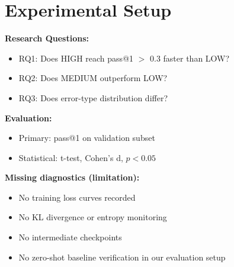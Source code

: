 \section{Experimental Setup}
\label{sec:experiments}

\textbf{Research Questions:}
\begin{itemize}
    \item RQ1: Does HIGH reach pass@1 $>$ 0.3 faster than LOW?
    \item RQ2: Does MEDIUM outperform LOW?
    \item RQ3: Does error-type distribution differ?
\end{itemize}

\textbf{Evaluation:}
\begin{itemize}
    \item Primary: pass@1 on validation subset
    \item Statistical: t-test, Cohen's d, $p < 0.05$
\end{itemize}

\textbf{Missing diagnostics (limitation):}
\begin{itemize}
    \item No training loss curves recorded
    \item No KL divergence or entropy monitoring
    \item No intermediate checkpoints
    \item No zero-shot baseline verification in our evaluation setup
\end{itemize}
